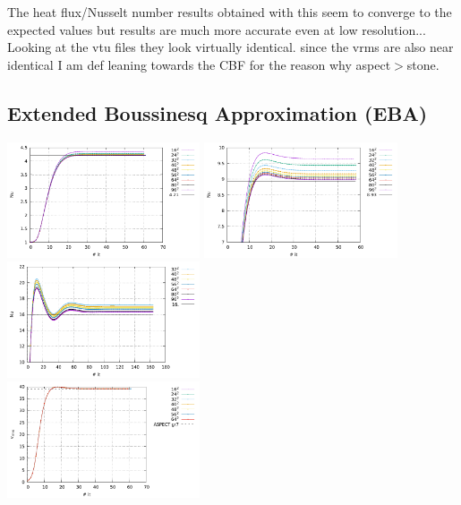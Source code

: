 The heat flux/Nusselt number results obtained with this \stone seem to converge 
to the expected values but \aspect results are much more accurate even at low
resolution... 
Looking at the vtu files they look virtually identical. since the vrms are also 
near identical I am def leaning towards the CBF for the reason why aspect$>$stone.



\newpage
\subsection*{Extended Boussinesq Approximation (EBA)}

\begin{center}
\includegraphics[width=5.7cm]{python_codes/fieldstone_110/results_EBA/Nu_Ra1e4.pdf}
\includegraphics[width=5.7cm]{python_codes/fieldstone_110/results_EBA/Nu_Ra1e5.pdf}
\includegraphics[width=5.7cm]{python_codes/fieldstone_110/results_EBA/Nu_Ra1e6.pdf}\\
\includegraphics[width=5.7cm]{python_codes/fieldstone_110/results_EBA/vrms_Ra1e4.pdf}

\end{center}
